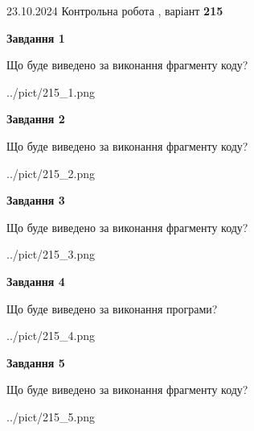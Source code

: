 \documentclass[12pt, ukrainian]{article}
\begin{document}
{\Large{23.10.2024 Контрольна робота , варіант  \No \textbf { 215 }\par}}
{
\begin {large}
{\begin {center}\textbf{Завдання 1}\end {center}}

Що буде виведено за виконання фрагменту коду?\par
\begin{center}
	{../pict/215_1.png}
\end{center}
\newpage

{\begin {center}\textbf{Завдання 2}\end {center}}

Що буде виведено за виконання фрагменту коду?\par
\begin{center}
	{../pict/215_2.png}
\end{center}
\newpage

{\begin {center}\textbf{Завдання 3}\end {center}}

Що буде виведено за виконання фрагменту коду?\par
\begin{center}
	{../pict/215_3.png}
\end{center}
\newpage

{\begin {center}\textbf{Завдання 4}\end {center}}

Що буде виведено за виконання програми?\par
\begin{center}
	{../pict/215_4.png}
\end{center}
\newpage

{\begin {center}\textbf{Завдання 5}\end {center}}

Що буде виведено за виконання фрагменту коду?\par
\begin{center}
	{../pict/215_5.png}
\end{center}
\newpage


\end{large}}
\end{document}
